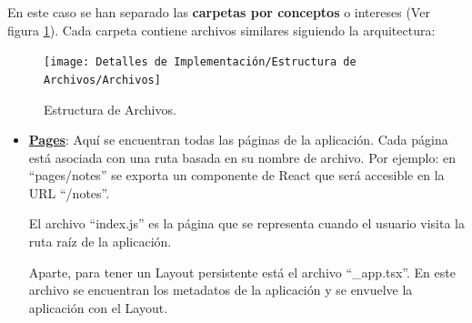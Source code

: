 \documentclass[12pt,twoside,titlepage]{report}
\begin{document}
En este caso se han separado las \textbf{carpetas por conceptos} o intereses (Ver figura \ref{fig:Archivos}). Cada carpeta contiene archivos similares siguiendo la arquitectura:

\begin{figure}[H]
    \centering
    \texttt{[image: Detalles de Implementación/Estructura de Archivos/Archivos]}
    \caption{Estructura de Archivos.}
    \label{fig:Archivos}
\end{figure}

\begin{itemize}
    \item \href{https://github.com/alberttogoca/EarFit/tree/main/src/pages}{\textbf{Pages}}: Aquí se encuentran todas las páginas de la aplicación. Cada página está asociada con una ruta basada en su nombre de archivo. Por ejemplo: en ``pages/notes'' se exporta un componente de React que será accesible en la URL ``/notes''.
    
    El archivo ``index.js'' es la página que se representa cuando el usuario visita la ruta raíz de la aplicación.

    Aparte, para tener un Layout persistente está el archivo ``\_app.tsx''. En este archivo se encuentran los metadatos de la aplicación y se envuelve la aplicación con el Layout. 
    

\end{itemize}
\end{document}
